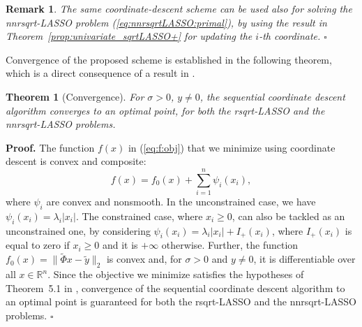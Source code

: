 \documentclass[11pt]{article}
\newcommand{\qed}{{\hfill $\square$}}
\newcommand{\lam}{\lambda}
\newcommand{\Real}[1]{ { {\mathbb R}^{#1} } }
\newtheorem{theorem}{Theorem}
\newtheorem{remark}{Remark}
\begin{document}
\begin{remark}\rm 
The same coordinate-descent scheme can be
used also for solving the nnrsqrt-LASSO problem  (\ref{eq:nnrsqrtLASSO:primal}), by using the result in Theorem~\ref{prop:univariate_sqrtLASSO+}
for updating the $i$-th coordinate. \qed
\end{remark}

Convergence of the proposed scheme is established in the following theorem, which is a
direct consequence of a result in \cite{Tseng:01}.

\begin{theorem}[Convergence]
For $\sigma>0$, $y\neq 0$,  the sequential coordinate descent algorithm converges
to an optimal point,
for both the rsqrt-LASSO and the nnrsqrt-LASSO problems.
\end{theorem}

\noindent
{\bf Proof.}
	The function $f(x)$ in (\ref{eq:f:obj}) that we minimize using coordinate descent is convex and composite:
	\[
	f(x) = f_0(x) + \sum_{i=1}^n \psi_i(x_i),
	\]
	where $\psi_i$ are convex and nonsmooth. 
	In the unconstrained case, we have $\psi_i(x_i)=\lam_i |x_i|$. The constrained case, where $x_i\geq 0$, can  also be tackled as an unconstrained one, by considering
	$\psi_i(x_i) = \lam_i |x_i| + I_+(x_i)$, where $I_+(x_i)$ is equal to zero if
	$x_i\geq 0$ and it is $+\infty$ otherwise. 	
	Further, the function $f_0(x)=\|\tilde\Phi x-\tilde y\|_2$ is convex and, for $\sigma>0$ and $y\neq 0$, 
	it is differentiable over all $x\in \Real{n}$.
	Since the objective we minimize satisfies the hypotheses of
	Theorem~5.1 in \cite{Tseng:01}, convergence 
	of the sequential coordinate descent algorithm to an optimal point
	 is guaranteed for both the rsqrt-LASSO and the nnrsqrt-LASSO problems.
	  \qed
\end{document}
